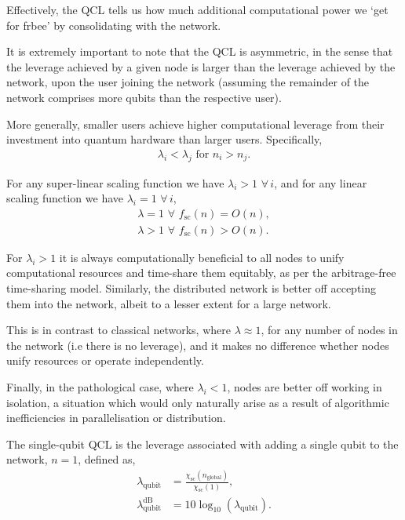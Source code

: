 Effectively, the QCL tells us how much additional computational power we `get for frbee' by consolidating with the network.

It is extremely important to note that the QCL is asymmetric, in the sense that the leverage achieved by a given node is larger than the leverage achieved by the network, upon the user joining the network (assuming the remainder of the network comprises more qubits than the respective user).

More generally, smaller users achieve higher computational leverage from their investment into quantum hardware than larger users. Specifically,
\begin{align}
	\lambda_i<\lambda_j \,\,\mathrm{for}\,\,n_i>n_j.
\end{align}

For any super-linear scaling function we have \mbox{$\lambda_i > 1 \,\,\forall \, i$}, and for any linear scaling function we have \mbox{$\lambda_i = 1 \,\,\forall \, i$},
\begin{align}
	\lambda=1\,\,\forall\,\,f_\mathrm{sc}(n)=O(n), \nonumber \\
	\lambda>1\,\,\forall\,\,f_\mathrm{sc}(n)>O(n).	
\end{align}

For \mbox{$\lambda_i>1$} it is always computationally beneficial to all nodes to unify computational resources and time-share them equitably, as per the arbitrage-free time-sharing model. Similarly, the distributed network is better off accepting them into the network, albeit to a lesser extent for a large network.

This is in contrast to classical networks, where \mbox{$\lambda\approx 1$}, for any number of nodes in the network (i.e there is no leverage), and it makes no difference whether nodes unify resources or operate independently.

Finally, in the pathological case, where \mbox{$\lambda_i<1$}, nodes are better off working in isolation, a situation which would only naturally arise as a result of algorithmic inefficiencies in parallelisation or distribution.

\begin{definition}
The single-qubit QCL is the leverage associated with adding a single qubit to the network, \mbox{$n=1$}, defined as,
\begin{align}
	\lambda_\mathrm{qubit} &= \frac{\chi_\mathrm{sc}(n_\mathrm{global})}{\chi_\mathrm{sc}(1)},\nonumber\\
	\lambda_\mathrm{qubit}^\mathrm{dB} &= 10\log_{10}(\lambda_\mathrm{qubit}).
\end{align}
\end{definition}

